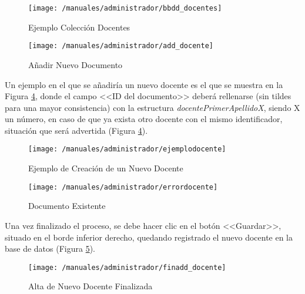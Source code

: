 \begin{figure}[!h]
	\begin{center}
		\texttt{[image: /manuales/administrador/bbdd\_docentes]}
		\caption{Ejemplo Colección Docentes}
		\label{fig:bbdddocentes}
	\end{center}
\end{figure}

\begin{figure}[!h]
	\begin{center}
		\texttt{[image: /manuales/administrador/add\_docente]}
		\caption{Añadir Nuevo Documento}
		\label{fig:adddocente}
	\end{center}
\end{figure}

\clearpage

Un ejemplo en el que se añadiría un nuevo docente es el que se muestra en la Figura \ref{fig:errordocente}, donde el campo <<ID del documento>> deberá rellenarse (sin tildes para una mayor consistencia) con la estructura \mbox{\textit{docentePrimerApellidoX}}, siendo X un número, en caso de que ya exista otro docente con el mismo identificador, situación que será advertida (Figura \ref{fig:errordocente}).

\begin{figure}[!h]
	\begin{center}
		\texttt{[image: /manuales/administrador/ejemplodocente]}
		\caption{Ejemplo de Creación de un Nuevo Docente}
		\label{fig:ejemploocente}
	\end{center}
\end{figure}

\begin{figure}[!h]
	\begin{center}
		\texttt{[image: /manuales/administrador/errordocente]}
		\caption{Documento Existente}
		\label{fig:errordocente}
	\end{center}
\end{figure}

Una vez finalizado el proceso, se debe hacer clic en el botón <<Guardar>>, situado en el borde inferior derecho, quedando registrado el nuevo docente en la base de datos (Figura \ref{fig:finadddocente}).

\begin{figure}[!h]
	\begin{center}
		\texttt{[image: /manuales/administrador/finadd\_docente]}
		\caption{Alta de Nuevo Docente Finalizada}
		\label{fig:finadddocente}
	\end{center}
\end{figure}

